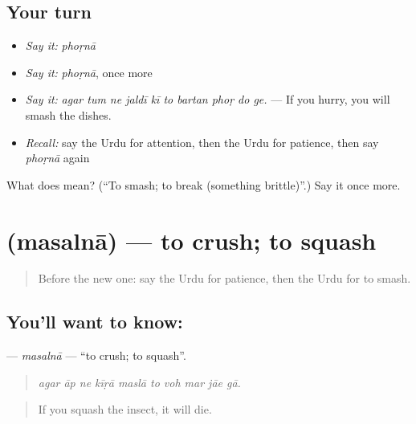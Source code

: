 \subsection*{Your turn}
\begin{itemize}
\raggedright
  \item \emph{Say it:} \emph{phoṛnā}
  \item \emph{Say it:} \emph{phoṛnā}, once more
  \item \emph{Say it:} \emph{agar tum ne jaldī kī to bartan phoṛ do ge.} — If you hurry, you will smash the dishes.
  \item \emph{Recall:} say the Urdu for attention, then the Urdu for patience, then say \emph{phoṛnā} again
\end{itemize}

\begin{tcolorbox}[breakable,colback=teal!4,colframe=teal!35!black,title={Before you move on}]
What does  mean? (\textquotedblleft{}To smash; to break (something brittle)\textquotedblright{}.) Say it once more.
\end{tcolorbox}
\section[\texorpdfstring{\ur{مسلنا} (masalnā)}{مسلنا (masalnā)}]{ (masalnā) — to crush; to squash}

\label{lesson:UR-C370-masalna}



\begin{quote}
Before the new one: say the Urdu for patience, then the Urdu for to smash.
\end{quote}

\subsection*{You'll want to know: }
\textbf{} — \emph{masalnā} — \textquotedblleft{}to crush; to squash\textquotedblright{}.

\begin{quote}
         
\end{quote}

\begin{quote}
\emph{agar āp ne kīṛā maslā to voh mar jāe gā.}
\end{quote}

\begin{quote}
If you squash the insect, it will die.
\end{quote}

